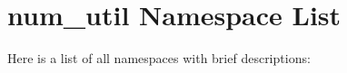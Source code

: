 \section{num\_\-util Namespace List}
Here is a list of all namespaces with brief descriptions:\begin{CompactList}
\item{}
\item{}
\end{CompactList}
